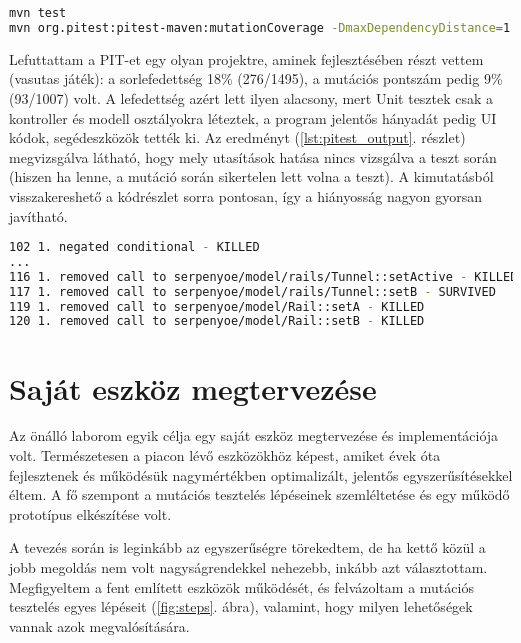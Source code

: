 \begin{lstlisting}[frame=single,float=!ht,caption={Példa a PITest paraméterezésére},captionpos=b,label={lst:pitest_bash},language=bash]
mvn test
mvn org.pitest:pitest-maven:mutationCoverage -DmaxDependencyDistance=1 -DtimeoutConstant=250
\end{lstlisting}

Lefuttattam a PIT-et egy olyan projektre, aminek fejlesztésében részt vettem (vasutas játék): a sorlefedettség 18\% (276/1495), a mutációs pontszám pedig 9\% (93/1007) volt. A lefedettség azért lett ilyen alacsony, mert Unit tesztek csak a kontroller és modell osztályokra léteztek, a program jelentős hányadát pedig UI kódok, segédeszközök tették ki. Az eredményt (\ref{lst:pitest_output}. részlet) megvizsgálva látható, hogy mely utasítások hatása nincs vizsgálva a teszt során (hiszen ha lenne, a mutáció során sikertelen lett volna a teszt). A kimutatásból visszakereshető a kódrészlet sorra pontosan, így a hiányosság nagyon gyorsan javítható.

\begin{lstlisting}[frame=single,float=!ht,caption={PIT kimenete},captionpos=b,label={lst:pitest_output},language=bash]
102	1. negated conditional - KILLED
...
116	1. removed call to serpenyoe/model/rails/Tunnel::setActive - KILLED
117	1. removed call to serpenyoe/model/rails/Tunnel::setB - SURVIVED
119	1. removed call to serpenyoe/model/Rail::setA - KILLED
120	1. removed call to serpenyoe/model/Rail::setB - KILLED
\end{lstlisting}

\section{Saját eszköz megtervezése}
Az önálló laborom egyik célja egy saját eszköz megtervezése és implementációja volt. Természetesen a piacon lévő eszközökhöz képest, amiket évek óta fejlesztenek és működésük nagymértékben optimalizált, jelentős egyszerűsítésekkel éltem. A fő szempont a mutációs tesztelés lépéseinek szemléltetése és egy működő prototípus elkészítése volt.

A tevezés során is leginkább az egyszerűségre törekedtem, de ha kettő közül a jobb megoldás nem volt nagyságrendekkel nehezebb, inkább azt választottam. Megfigyeltem a fent említett eszközök működését, és felvázoltam a mutációs tesztelés egyes lépéseit (\ref{fig:steps}. ábra), valamint, hogy milyen lehetőségek vannak azok megvalósítására.

